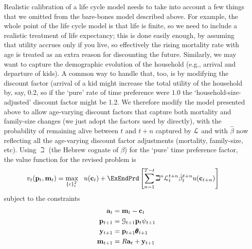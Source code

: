 \documentclass[titlepage, headings=optiontotocandhead]{Resources/texmf-local/tex/latex/econtex}
\begin{document}
Realistic calibration of a life cycle model needs to take into account a few things that we omitted from the bare-bones model described above. For example, the whole point of the life cycle model is that life is finite, so we need to include a realistic treatment of life expectancy; this is done easily enough, by assuming that utility accrues only if you live, so effectively the rising mortality rate with age is treated as an extra reason for discounting the future.  Similarly, we may want to capture the demographic evolution of the household (e.g., arrival and departure of kids).  A common way to handle that, too, is by modifying the discount factor (arrival of a kid might increase the total utility of the household by, say, 0.2, so if the `pure' rate of time preference were $1.0$ the `household-size-adjusted' discount factor might be 1.2.  We therefore modify the model presented above to allow age-varying discount factors that capture both mortality and family-size changes (we just adopt the factors used by \cite{cagettiWprofiles} directly), with the probability of remaining alive between $t$ and $t+n$ captured by $\mathcal{L}$ and with $\hat{\beta}$ now reflecting all the age-varying discount factor adjustments (mortality, family-size, etc).  Using $\beth$ (the Hebrew cognate of $\beta$) for the `pure' time preference factor, the value function for the revised problem is
  \begin{equation}\begin{gathered}\begin{aligned}
        v_{t}(\pLvl_{t},\mLvl_{t}) & =    \max_{\{\cFunc\}_{t}^{T}}~~ u(\cLvl_{t})+\ExEndPrd\left[\sum_{n=1}^{T-t}\beth^{n} \Alive_{t}^{t+n}\hat{\beta}_{t}^{t+n} u(\cLvl_{t+n}) \right]   \label{eq:lifecyclemax}
      \end{aligned}\end{gathered}  \end{equation}
subject to the constraints
  \begin{equation*}\begin{gathered}\begin{aligned}
        \mathbf{a}_{t}  & = \mathbf{m}_{t}-\mathbf{c}_{t}
        \\      \mathbf{p}_{t+1}  & = \mathcal{G}_{t+1}\mathbf{p}_{t}\psi_{t+1}
        \\      \mathbf{y}_{t+1}  & = \mathbf{p}_{t+1}\pmb{\theta} _{t+1}
        \\      \mathbf{m}_{t+1}  & = R \mathbf{a}_{t}+\mathbf{y}_{t+1}
      \end{aligned}\end{gathered}\end{equation*}
\end{document}
